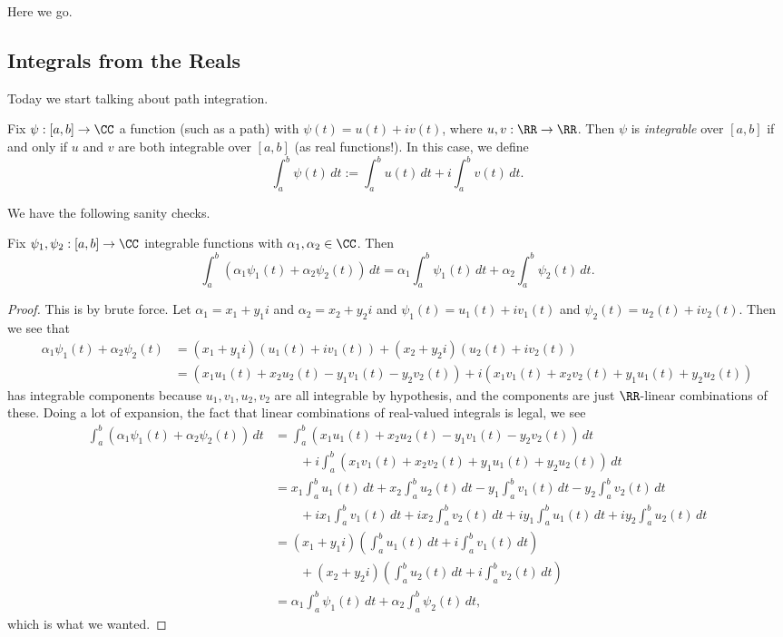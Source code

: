 
Here we go.

\subsection{Integrals from the Reals}
Today we start talking about path integration.
\begin{definition}[Integrable]
	Fix $\psi:[a,b]\to\CC$ a function (such as a path) with $\psi(t)=u(t)+iv(t)$, where $u,v:\RR\to\RR$. Then $\psi$ is \textit{integrable} over $[a,b]$ if and only if $u$ and $v$ are both integrable over $[a,b]$ (as real functions!). In this case, we define
	\[\int_a^b\psi(t)\,dt:=\int_a^bu(t)\,dt+i\int_a^bv(t)\,dt.\]
\end{definition}
We have the following sanity checks.
\begin{lemma}
	Fix $\psi_1,\psi_2:[a,b]\to\CC$ integrable functions with $\alpha_1,\alpha_2\in\CC$. Then
	\[\int_a^b(\alpha_1\psi_1(t)+\alpha_2\psi_2(t))\,dt=\alpha_1\int_a^b\psi_1(t)\,dt+\alpha_2\int_a^b\psi_2(t)\,dt.\]
\end{lemma}
\begin{proof}
	This is by brute force. Let $\alpha_1=x_1+y_1i$ and $\alpha_2=x_2+y_2i$ and $\psi_1(t)=u_1(t)+iv_1(t)$ and $\psi_2(t)=u_2(t)+iv_2(t)$. Then we see that
	\begin{align*}
		\alpha_1\psi_1(t)+\alpha_2\psi_2(t) &= (x_1+y_1i)(u_1(t)+iv_1(t))+(x_2
		+y_2i)(u_2(t)+iv_2(t)) \\
		&= (x_1u_1(t)+x_2u_2(t)-y_1v_1(t)-y_2v_2(t))+i(x_1v_1(t)+x_2v_2(t)+y_1u_1(t)+y_2u_2(t))
	\end{align*}
	has integrable components because $u_1,v_1,u_2,v_2$ are all integrable by hypothesis, and the components are just $\RR$-linear combinations of these. Doing a lot of expansion, the fact that linear combinations of real-valued integrals is legal, we see
	\begin{align*}
		\int_a^b(\alpha_1\psi_1(t)+\alpha_2\psi_2(t))\,dt &= \int_a^b(x_1u_1(t)+x_2u_2(t)-y_1v_1(t)-y_2v_2(t))\,dt \\
		&\qquad+i\int_a^b(x_1v_1(t)+x_2v_2(t)+y_1u_1(t)+y_2u_2(t))\,dt \\
		&= x_1\int_a^bu_1(t)\,dt+x_2\int_a^bu_2(t)\,dt-y_1\int_a^bv_1(t)\,dt-y_2\int_a^bv_2(t)\,dt \\
		&\qquad+ix_1\int_a^bv_1(t)\,dt+ix_2\int_a^bv_2(t)\,dt+iy_1\int_a^bu_1(t)\,dt+iy_2\int_a^bu_2(t)\,dt \\
		&= (x_1+y_1i)\left(\int_a^bu_1(t)\,dt+i\int_a^bv_1(t)\,dt\right)\\
		&\qquad+(x_2+y_2i)\left(\int_a^bu_2(t)\,dt+i\int_a^bv_2(t)\,dt\right) \\
		&= \alpha_1\int_a^b\psi_1(t)\,dt+\alpha_2\int_a^b\psi_2(t)\,dt,
	\end{align*}
	which is what we wanted.
\end{proof}
